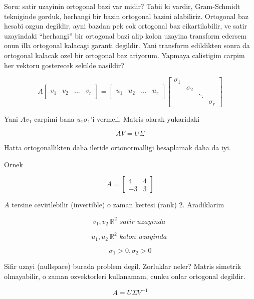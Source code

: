 \documentclass[12pt,fleqn]{article}\usepackage{../common}
\begin{document}
Soru: satir uzayinin ortogonal bazi var midir? Tabii ki vardir,
Gram-Schmidt tekniginde gorduk, herhangi bir bazin ortogonal bazini
alabiliriz. Ortogonal baz hesabi ozgun degildir, ayni bazdan pek cok
ortogonal baz cikartilabilir, ve satir uzayindaki ``herhangi'' bir
ortogonal bazi alip kolon uzayina transform edersem onun illa ortogonal
kalacagi garanti degildir. Yani transform edildikten sonra da ortogonal
kalacak ozel bir ortogonal baz ariyorum. Yapmaya calistigim carpim her
vektoru gosterecek sekilde nasildir?

\[ 
A \left[\begin{array}{rrrr}
&&& \\
v_1 & v_2& ... & v_r \\
&&& 
\end{array}\right] = 
\left[\begin{array}{rrrr}
&&& \\
u_1 & u_2& ... & u_r \\
&&& 
\end{array}\right] 
\left[\begin{array}{rrrr}
\sigma_1 &&& \\
 & \sigma_2&  & \\
&& \ddots & \\
&&& \sigma_r
\end{array}\right] 
 \]

Yani $Av_1$ carpimi bana $u_1 \sigma_1$'i vermeli. Matris olarak yukaridaki 

\[ AV = U\Sigma \]

Hatta ortogonallikten daha ileride ortonormalligi hesaplamak daha da iyi. 

Ornek 

\[ 
A = 
\left[\begin{array}{rr}
4 & 4 \\ -3 & 3
\end{array}\right]
 \]

$A$ tersine cevirilebilir (invertible) o zaman kertesi (rank)
2. Aradiklarim 

\[ v_1,v_2 \  \mathbb{R}^2 \textit{ satir uzayinda }  \]

\[ u_1,u_2 \  \mathbb{R}^2 \textit{ kolon uzayinda }  \]

\[ \sigma_1 > 0, \sigma_2 > 0 \]

Sifir uzayi (nullspace) burada problem degil. Zorluklar neler? Matris
simetrik olmayabilir, o zaman ozvektorleri kullanamam, cunku onlar
ortogonal degildir.

\[ A = U \Sigma V^{-1} \]
\end{document}
